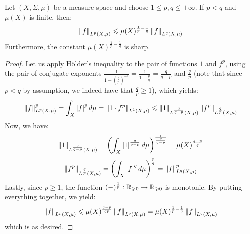         \begin{lemma} \label{lemma: comparing_L_p_norms}
            Let $(X, \Sigma, \mu)$ be a measure space and choose $1 \leq p, q \leq +\infty$. If $p < q$ and $\mu(X)$ is finite, then:
                $$\left\| {f} \right\|_{L^p(X, \mu)} \leqslant \mu(X)^{\frac1p - \frac1q} \left\| {f} \right\|_{L^q(X, \mu)}$$
            Furthermore, the constant $\mu(X)^{\frac1p - \frac1q}$ is sharp.
        \end{lemma}
            \begin{proof}
                Let us apply H\"older's inequality to the pair of functions $1$ and $f^p$, using the pair of conjugate exponents $\frac{1}{1 - \left(\frac{q}{p}\right)^{-1}} = \frac{1}{1 - \frac{p}{q}} = \frac{q}{q - p}$ and $\frac{q}{p}$ (note that since $p < q$ by assumption, we indeed have that $\frac{q}{p} \geq 1$), which yields:
                    $$\left\| {f} \right\|_{L^p(X, \mu)}^p = \int_X \left\lvert {f} \right\rvert^p d\mu = \left\| { 1 \cdot f^p } \right\|_{L^1(X, \mu)} \leqslant \left\| {1} \right\|_{L^{\frac{q}{q - p}}(X, \mu)} \left\| {f^p} \right\|_{L^{\frac{q}{p}}(X, \mu)}$$
                Now, we have:
                    $$\left\| {1} \right\|_{L^{\frac{q}{q - p}}(X, \mu)} = \left(\int_X \left\lvert {1} \right\rvert^{\frac{q}{q - p}} d\mu\right)^{ \frac{1}{\frac{q}{q - p}} } = \mu(X)^{ \frac{q - p}{q} }$$
                    $$\left\| {f^p} \right\|_{L^{\frac{q}{p}}(X, \mu)} = \left( \int_X \left\lvert {f} \right\rvert^q d\mu \right)^{\frac{p}{q}} = \left\| {f} \right\|_{L^q(X, \mu)}^p$$
                Lastly, since $p \geq 1$, the function $(-)^{\frac1p}: \mathbb{R}_{\geqslant 0} \to \mathbb{R}_{\geqslant 0}$ is monotonic. By putting everything together, we yield:
                    $$\left\| {f} \right\|_{L^p(X, \mu)} \leqslant \mu(X)^{ \frac{q - p}{qp} } \left\| {f} \right\|_{L^q(X, \mu)} = \mu(X)^{\frac1p - \frac1q} \left\| {f} \right\|_{L^q(X, \mu)}$$
                which is as desired.
            \end{proof}
            
